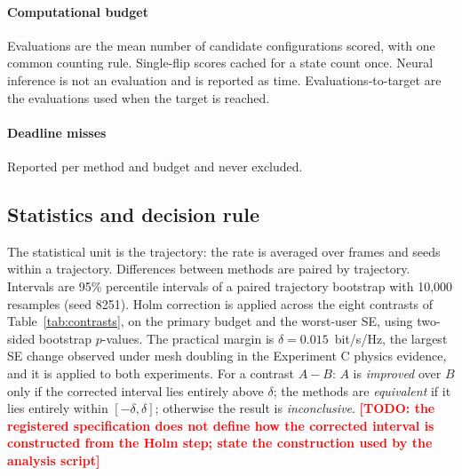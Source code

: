 \documentclass[conference]{IEEEtran}
\newcommand{\margin}{\delta}
\newcommand{\TODO}[1]{\textbf{\textcolor{red}{[TODO: #1]}}}
\begin{document}
\paragraph{Computational budget} Evaluations are the mean number of candidate configurations scored, with one common counting rule. Single-flip scores cached for a state count once. Neural inference is not an evaluation and is reported as time. Evaluations-to-target are the evaluations used when the target is reached.
\paragraph{Deadline misses} Reported per method and budget and never excluded.

\subsection{Statistics and decision rule}
The statistical unit is the trajectory: the rate is averaged over frames and seeds within a trajectory. Differences between methods are paired by trajectory. Intervals are 95\% percentile intervals of a paired trajectory bootstrap with 10{,}000 resamples (seed 8251). Holm correction is applied across the eight contrasts of Table~\ref{tab:contrasts}, on the primary budget and the worst-user SE, using two-sided bootstrap $p$-values. The practical margin is $\margin=0.015$~bit/s/Hz, the largest SE change observed under mesh doubling in the Experiment C physics evidence, and it is applied to both experiments. For a contrast $A-B$: $A$ is \emph{improved} over $B$ only if the corrected interval lies entirely above $\margin$; the methods are \emph{equivalent} if it lies entirely within $[-\margin,\margin]$; otherwise the result is \emph{inconclusive}. \TODO{the registered specification does not define how the corrected interval is constructed from the Holm step; state the construction used by the analysis script}
\end{document}
